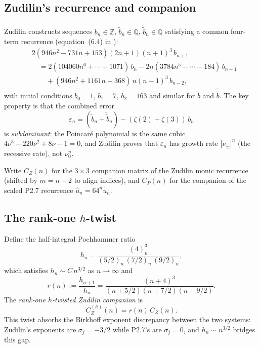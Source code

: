 \documentclass[11pt]{article}
\theoremstyle{remark}
\begin{document}
\subsection{Zudilin's recurrence and companion}

Zudilin \cite{Zudilin2004} constructs sequences $b_n \in \mathbb{Z}$,
$\tilde{b}_n \in \mathbb{Q}$, $\tilde{\tilde{b}}_n \in \mathbb{Q}$
satisfying a common four-term recurrence (equation~(6.4) in
\cite{Zudilin2004}):
\begin{equation}\label{eq:zudilin-rec}
\begin{aligned}
&2(946n^2{-}731n{+}153)(2n{+}1)(n{+}1)^3\,b_{n+1} \\
&\quad = 2(104060n^6{+}\cdots{+}1071)\,b_n
- 2n(3784n^5{-}\cdots{-}184)\,b_{n-1} \\
&\quad\quad + (946n^2{+}1161n{+}368)\,n(n{-}1)^3\,b_{n-2},
\end{aligned}
\end{equation}
with initial conditions $b_0 = 1$, $b_1 = 7$, $b_2 = 163$
and similar for $\tilde{b}$ and $\tilde{\tilde{b}}$.
The key property is that the combined error
\begin{equation}\label{eq:zudilin-error}
\varepsilon_n = (\tilde{b}_n + \tilde{\tilde{b}}_n)
- (\zeta(2)+\zeta(3))\,b_n
\end{equation}
is \emph{subdominant}: the Poincar\'e polynomial is the same
cubic $4\nu^3 - 220\nu^2 + 8\nu - 1 = 0$, and Zudilin proves
that $\varepsilon_n$ has growth rate $|\nu_\pm|^n$ (the
recessive rate), not $\nu_0^n$.

Write $C_Z(n)$ for the $3\times 3$ companion matrix of the
Zudilin monic recurrence (shifted by $m = n+2$ to align
indices), and $C_P(n)$ for the companion of the scaled P2.7
recurrence $\hat{u}_n = 64^n u_n$.

\subsection{The rank-one $h$-twist}

Define the half-integral Pochhammer ratio
\begin{equation}\label{eq:h}
h_n = \frac{(4)_n^3}{(5/2)_n\,(7/2)_n\,(9/2)_n},
\end{equation}
which satisfies $h_n \sim C\,n^{3/2}$ as $n \to \infty$ and
\[
r(n) := \frac{h_{n+1}}{h_n}
= \frac{(n+4)^3}{(n+5/2)(n+7/2)(n+9/2)}.
\]
The \emph{rank-one $h$-twisted Zudilin companion} is
\begin{equation}\label{eq:CZh}
C_Z^{(h)}(n) = r(n)\,C_Z(n).
\end{equation}
This twist absorbs the Birkhoff exponent discrepancy between
the two systems: Zudilin's exponents are $\sigma_j = -3/2$
while P2.7's are $\sigma_j = 0$, and $h_n \sim n^{3/2}$
bridges this gap.
\end{document}
